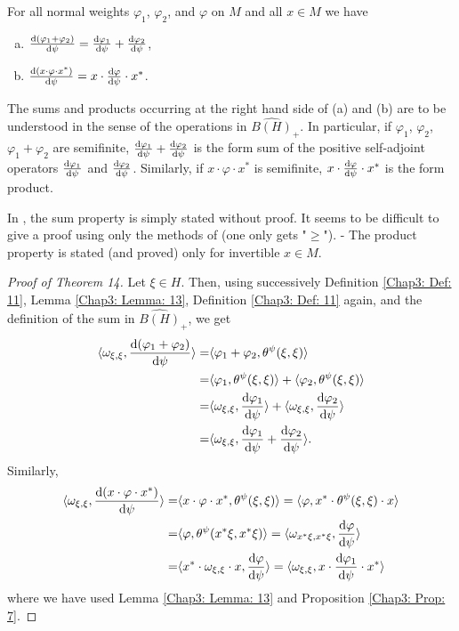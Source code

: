 \begin{theorem}
    For all normal weights $\varphi_1$, $\varphi_2$, and $\varphi$ on $M$ and all $x\in M$ we have
    \begin{enumerate}[(a)]
        \item $\dv{(\varphi_1+\varphi_2)}{\psi}=\dv{\varphi_1}{\psi}+\dv{\varphi_2}{\psi}$,
        \item $\dv{(x\cdot\varphi\cdot x^*)}{\psi}=x\cdot\dv{\varphi}{\psi}\cdot x^*$.
    \end{enumerate}
\end{theorem}
\begin{remark}
    The sums and products occurring at the right hand side of (a) and (b) are to be understood in the sense of the operations in $\widehat{B(H)}_+$. In particular, if $\varphi_1$, $\varphi_2$, $\varphi_1+\varphi_2$ are semifinite, $\dv{\varphi_1}{\psi}+\dv{\varphi_2}{\psi}$ is the form sum of the positive self-adjoint operators $\dv{\varphi_1}{\psi}$ and $\dv{\varphi_2}{\psi}$. Similarly, if $x\cdot\varphi\cdot x^*$ is semifinite, $x\cdot\dv{\varphi}{\psi}\cdot x^*$ is the form product.
\end{remark}
\begin{remark}
    In \cite{1}, the sum property is simply stated without proof. It seems to be difficult to give a proof using only the methods of \cite{1} (one only gets "$\geq$"). - The product property is stated (and proved) only for invertible $x\in M$.
\end{remark}
\begin{proof}[Proof of Theorem 14]
    Let $\xi\in H$. Then, using successively Definition \ref{Chap3: Def: 11}, Lemma \ref{Chap3: Lemma: 13}, Definition \ref{Chap3: Def: 11} again, and the definition of the sum in $\widehat{B(H)}_+$, we get
    \[
        \begin{split}
            \langle\omega_{\xi,\xi},\dv{(\varphi_1+\varphi_2)}{\psi}\rangle=&\langle\varphi_1+\varphi_2,\theta^\psi(\xi,\xi)\rangle\\
            =&\langle\varphi_1,\theta^\psi(\xi,\xi)\rangle+\langle\varphi_2,\theta^\psi(\xi,\xi)\rangle\\
            =&\langle\omega_{\xi,\xi},\dv{\varphi_1}{\psi}\rangle+\langle\omega_{\xi,\xi},\dv{\varphi_2}{\psi}\rangle\\
            =&\langle\omega_{\xi,\xi},\dv{\varphi_1}{\psi}+\dv{\varphi_2}{\psi}\rangle.
        \end{split}
    \]
    Similarly,
    \[
        \begin{split}
            \langle\omega_{\xi,\xi},\dv{(x\cdot\varphi\cdot x^*)}{\psi}\rangle=&\langle x\cdot\varphi\cdot x^*,\theta^\psi(\xi,\xi)\rangle=\langle\varphi,x^*\cdot\theta^\psi(\xi,\xi)\cdot x\rangle\\
            =&\langle\varphi,\theta^\psi(x^*\xi,x^*\xi)\rangle=\langle\omega_{x^*\xi,x^*\xi},\dv{\varphi}{\psi}\rangle\\
            =&\langle x^*\cdot\omega_{\xi,\xi}\cdot x,\dv{\varphi}{\psi}\rangle=\langle\omega_{\xi,\xi},x\cdot\dv{\varphi_1}{\psi}\cdot x^*\rangle
        \end{split}
    \]
    where we have used Lemma \ref{Chap3: Lemma: 13} and Proposition \ref{Chap3: Prop: 7}.
\end{proof}
